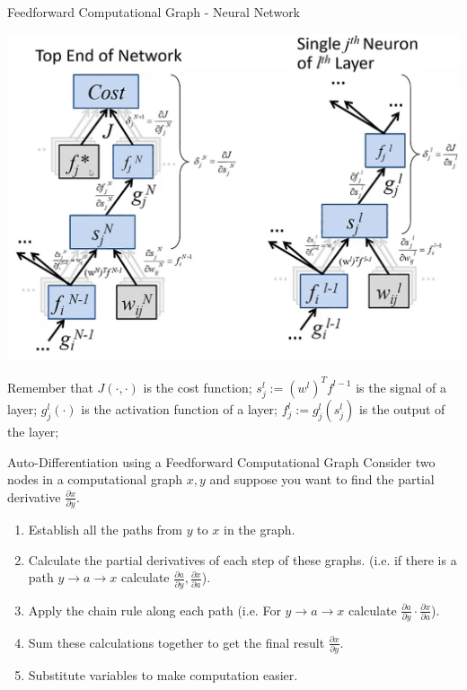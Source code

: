 \documentclass[11pt,a4paper]{article}
\begin{document}
  \begin{proposition}{Feedforward Computational Graph - Neural Network}
    \begin{center}
      \includegraphics[width=.7\textwidth]{NeuralNetworkComputationalGraph.PNG}
    \end{center}
    Remember that $J(\cdot,\cdot)$ is the cost function; $s_j^l:=(w^l)^Tf^{l-1}$ is the signal of a layer; $g_j^l(\cdot)$ is the activation function of a layer; $f_j^l:=g_j^l(s_j^l)$ is the output of the layer;
  \end{proposition}

  \begin{definition}{Auto-Differentiation using a Feedforward Computational Graph}
    Consider two nodes in a computational graph $x,y$ and suppose you want to find the partial derivative $\frac{\partial x}{\partial y}$.
    \begin{enumerate}
      \item Establish all the paths from $y$ to $x$ in the graph.
      \item Calculate the partial derivatives of each step of these graphs. (i.e. if there is a path $y\to a\to x$ calculate $\frac{\partial a}{\partial y},\frac{\partial x}{\partial a}$).
      \item Apply the chain rule along each path (i.e. For $y\to a\to x$ calculate $\frac{\partial a}{\partial y}\cdot\frac{\partial x}{\partial a}$).
      \item Sum these calculations together to get the final result $\frac{\partial x}{\partial y}$.
      \item Substitute variables to make computation easier.
    \end{enumerate}
  \end{definition}
\end{document}
